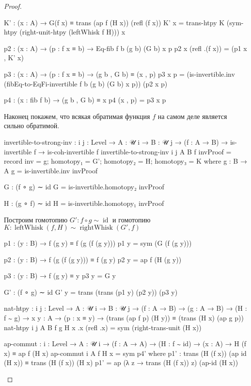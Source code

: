 \documentclass{article}[12pt]
\newcommand{\op}{\operatorname}
\begin{document}
\begin{proof}
\begin{code}
        K' : (x : A) → G(f x) ≡ trans (ap f (H x)) (refl (f x))
        K' x = trans-htpy K (sym-htpy (right-unit-htpy (leftWhisk f H))) x

        p2 : (x : A) → (p : f x ≡ b) → Eq-fib f b (g b) (G b) x p
        p2 x (refl .(f x)) = (p1 x , K' x)

        p3 : (x : A) → (p : f x ≡ b) → (g b , G b) ≡ (x , p)
        p3 x p = (is-invertible.inv (fibEq-to-EqFi-invertible f b (g b) (G b) x p)) (p2 x p)

        p4 : (x : fib f b) → (g b , G b) ≡ x
        p4 (x , p) = p3 x p
\end{code}

Наконец покажем, что всякая обратимая функция $f$ на самом деле является сильно обратимой.
\begin{code}
invertible-to-strong-inv : {i j : Level} → {A : 𝒰 i} → {B : 𝒰 j} → (f : A → B) 
                           → is-invertible f 
                           → is-coh-invertible f
invertible-to-strong-inv {i} {j} {A} {B} f invProof = 
    record {inv = g;
            homotopy₁ = G';
            homotopy₂ = H;
            homotopy₃ = K}
    where
        g : B → A
        g = is-invertible.inv invProof

        G : (f ∘ g) ∼ id
        G = is-invertible.homotopy₂ invProof

        H : (g ∘ f) ∼ id
        H = is-invertible.homotopy₁ invProof
\end{code}
Построим гомотопию $G' : f \circ g \sim \op{id}$ и гомотопию 
$K : \op{leftWhisk}(f, H) \sim \op{rightWhisk}(G', f)$
\begin{code}
        p1 : (y : B) → f (g y) ≡ f (g (f (g y)))
        p1 y = sym (G (f (g y)))

        p2 : (y : B) → f (g (f (g y))) ≡ f (g y)
        p2 y = ap f (H (g y))

        p3 : (y : B) → f (g y) ≡ y
        p3 y = G y

        G' : (f ∘ g) ∼ id
        G' y = trans (trans (p1 y) (p2 y)) (p3 y)

        nat-htpy : {i j : Level} → {A : 𝒰 i} → {B : 𝒰 j}
                   → (f : A → B)
                   → (g : A → B)
                   → (H : f ∼ g)
                   → {x y : A}
                   → (p : x ≡ y)
                   → (trans (ap f p) (H y)) ≡ (trans (H x) (ap g p))
        nat-htpy {i} {j} {A} {B} f g H {x} {.x} (refl .x) = sym (right-trans-unit (H x))

        ap-commut : {i : Level} → {A : 𝒰 i}
                    → (f : A → A)
                    → (H : f ∼ id)
                    → (x : A)
                    → H (f x) ≡ ap f (H x)
        ap-commut {i} {A} f H x = sym p4'
            where
                p1' : trans (H (f x)) (ap id (H x)) ≡ trans (H (f x)) (H x)
                p1' = ap (λ z → trans (H (f x)) z) (ap-id (H x))


\end{code}
\end{proof}
\end{document}
